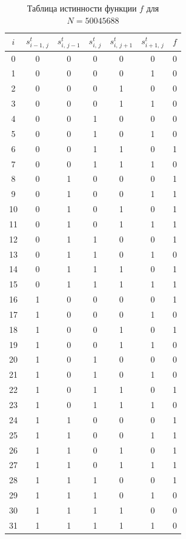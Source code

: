 \begin{table}[H]
\centering
\renewcommand{\arraystretch}{0.95}
\begin{tabular}{|c|c|c|c|c|c|c|}
\hline
$i$ & $s^t_{i-1,\,j}$ & $s^t_{i,\,j-1}$ & $s^t_{i,\,j}$ & $s^t_{i,\,j+1}$ & $s^t_{i+1,\,j}$ & $f$ \\
\hline
0 & 0 & 0 & 0 & 0 & 0 & 0 \\
1 & 0 & 0 & 0 & 0 & 1 & 0 \\
2 & 0 & 0 & 0 & 1 & 0 & 0 \\
3 & 0 & 0 & 0 & 1 & 1 & 0 \\
4 & 0 & 0 & 1 & 0 & 0 & 0 \\
5 & 0 & 0 & 1 & 0 & 1 & 0 \\
6 & 0 & 0 & 1 & 1 & 0 & 1 \\
7 & 0 & 0 & 1 & 1 & 1 & 0 \\
8 & 0 & 1 & 0 & 0 & 0 & 1 \\
9 & 0 & 1 & 0 & 0 & 1 & 1 \\
10 & 0 & 1 & 0 & 1 & 0 & 1 \\
11 & 0 & 1 & 0 & 1 & 1 & 1 \\
12 & 0 & 1 & 1 & 0 & 0 & 1 \\
13 & 0 & 1 & 1 & 0 & 1 & 0 \\
14 & 0 & 1 & 1 & 1 & 0 & 1 \\
15 & 0 & 1 & 1 & 1 & 1 & 1 \\
16 & 1 & 0 & 0 & 0 & 0 & 1 \\
17 & 1 & 0 & 0 & 0 & 1 & 0 \\
18 & 1 & 0 & 0 & 1 & 0 & 1 \\
19 & 1 & 0 & 0 & 1 & 1 & 0 \\
20 & 1 & 0 & 1 & 0 & 0 & 0 \\
21 & 1 & 0 & 1 & 0 & 1 & 0 \\
22 & 1 & 0 & 1 & 1 & 0 & 1 \\
23 & 1 & 0 & 1 & 1 & 1 & 0 \\
24 & 1 & 1 & 0 & 0 & 0 & 1 \\
25 & 1 & 1 & 0 & 0 & 1 & 1 \\
26 & 1 & 1 & 0 & 1 & 0 & 1 \\
27 & 1 & 1 & 0 & 1 & 1 & 1 \\
28 & 1 & 1 & 1 & 0 & 0 & 1 \\
29 & 1 & 1 & 1 & 0 & 1 & 0 \\
30 & 1 & 1 & 1 & 1 & 0 & 0 \\
31 & 1 & 1 & 1 & 1 & 1 & 0 \\
\hline
\end{tabular}
\caption{Таблица истинности функции $f$ для $N=50045688$}
\label{tab:truth}
\end{table}